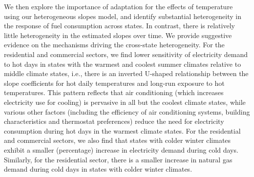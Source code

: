 \documentclass[11pt]{article}
\begin{document}
We then explore the importance of adaptation for the effects of temperature using our heterogeneous slopes model, and identify substantial heterogeneity in the response of fuel consumption across states. In contrast, there is relatively little heterogeneity in the estimated slopes over time. We provide suggestive evidence on the mechanisms driving the cross-state heterogeneity. For the residential and commercial sectors, we find lower sensitivity of electricity demand to hot days in states with the warmest and coolest summer climates relative to middle climate states, i.e., there is an inverted U-shaped relationship between the slope coefficients for hot daily temperatures and long-run exposure to hot temperatures. %
This pattern reflects that air conditioning (which increases electricity use for cooling) is pervasive in all but the coolest climate states, while various other factors (including the efficiency of air conditioning systems, building characteristics and thermostat preferences) reduce the need for electricity consumption during hot days in the warmest climate states. For the residential and commercial sectors, we also find that states with colder winter climates exhibit a smaller (percentage) increase in electricity demand during cold days. Similarly, for the residential sector, there is a smaller increase in natural gas demand during cold days in states with colder winter climates. %
\end{document}
